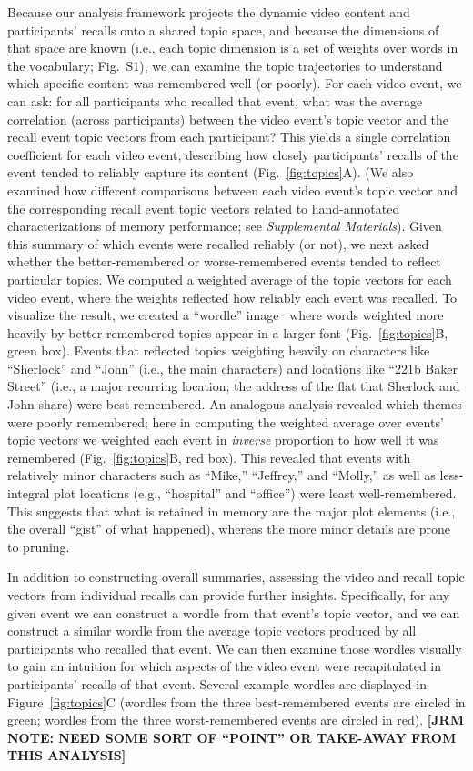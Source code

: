 \documentclass{article}
\newcommand{\topics}{S1}
\begin{document}
Because our analysis framework projects the dynamic video content and participants' recalls onto a shared topic space, and because the dimensions of that space are known (i.e., each topic dimension is a set of weights over words in the vocabulary; Fig.~\topics), we can examine the topic trajectories to understand which specific content was remembered well (or poorly).  For each video event, we can ask: for all participants who recalled that event, what was the average correlation (across participants) between the video event's topic vector and the recall event topic vectors from each participant?  This yields a single correlation coefficient for each video event, describing how closely participants' recalls of the event tended to reliably capture its content (Fig.~\ref{fig:topics}A).  (We also examined how different comparisons between each video event's topic vector and the corresponding recall event topic vectors related to hand-annotated characterizations of memory performance; see \textit{Supplemental Materials}).  Given this summary of which events were recalled reliably (or not), we next asked whether the better-remembered or worse-remembered events tended to reflect particular topics.  We computed a weighted average of the topic vectors for each video event, where the weights reflected how reliably each event was recalled.  To visualize the result, we created a ``wordle'' image~\citep{MuelEtal18} where words weighted more heavily by better-remembered topics appear in a larger font (Fig.~\ref{fig:topics}B, green box).  Events that reflected topics weighting heavily on characters like ``Sherlock'' and ``John'' (i.e., the main characters) and locations like ``221b Baker Street'' (i.e., a major recurring location; the address of the flat that Sherlock and John share) were best remembered.  An analogous analysis revealed which themes were poorly remembered; here in computing the weighted average over events' topic vectors we weighted each event in \textit{inverse} proportion to how well it was remembered (Fig.~\ref{fig:topics}B, red box).  This revealed that events with relatively minor characters such as ``Mike,'' ``Jeffrey,'' and ``Molly,'' as well as less-integral plot locations (e.g., ``hospital'' and ``office'') were least well-remembered.  This suggests that what is retained in memory are the major plot elements (i.e., the overall ``gist'' of what happened), whereas the more minor details are prone to pruning.

In addition to constructing overall summaries, assessing the video and recall topic vectors from individual recalls can provide further insights.  Specifically, for any given event we can construct a wordle from that event's topic vector, and we can construct a similar wordle from the average topic vectors produced by all participants who recalled that event.  We can then examine those wordles visually to gain an intuition for which aspects of the video event were recapitulated in participants' recalls of that event.  Several example wordles are displayed in Figure~\ref{fig:topics}C (wordles from the three best-remembered events are circled in green; wordles from the three worst-remembered events are circled in red).  \textbf{[JRM NOTE: NEED SOME SORT OF ``POINT'' OR TAKE-AWAY FROM THIS ANALYSIS]}
\end{document}
